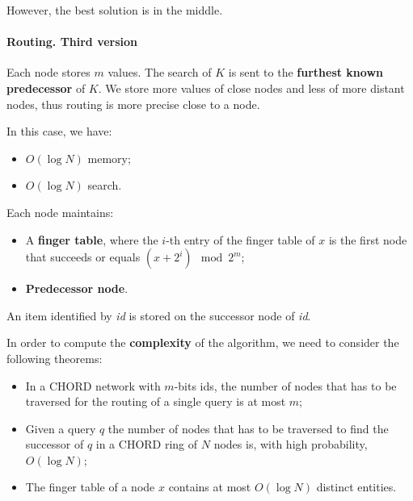 However, the best solution is in the middle.

\paragraph{Routing. Third version} Each node stores $m$ values. The search of $K$ is sent to the \textbf{furthest known predecessor} of $K$. We store more values of close nodes and less of more distant nodes, thus routing is more precise close to a node.

In this case, we have:
\begin{itemize}
    \item $O(\log N)$ memory;
    \item $O(\log N)$ search.
\end{itemize}

Each node maintains:
\begin{itemize}
    \item A \textbf{finger table}, where the $i$-th entry of the finger table of $x$ is the first node that succeeds or equals $(x + 2^i) \mod 2^m$;
    \item \textbf{Predecessor node}.
\end{itemize}
An item identified by \textit{id} is stored on the successor node of \textit{id}.



In order to compute the \textbf{complexity} of the algorithm, we need to consider the following theorems:
\begin{itemize}
    \item In a CHORD network with $m$-bits ids, the number of nodes that has to be traversed for the routing of a single query is at most $m$;
    \item Given a query $q$ the number of nodes that has to be traversed to find the successor of $q$ in a CHORD ring of $N$ nodes is, with high probability, $O(\log N)$;
    \item The finger table of a node $x$ contains at most $O(\log N)$ distinct entities.
\end{itemize}

